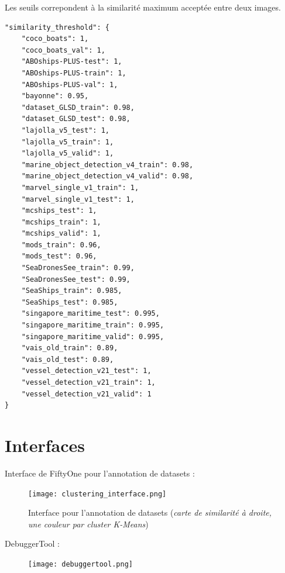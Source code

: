 Les seuils correpondent à la similarité maximum acceptée entre deux images.

\begin{verbatim}
"similarity_threshold": {
    "coco_boats": 1,
    "coco_boats_val": 1,
    "ABOships-PLUS-test": 1,
    "ABOships-PLUS-train": 1,
    "ABOships-PLUS-val": 1,
    "bayonne": 0.95,
    "dataset_GLSD_train": 0.98,
    "dataset_GLSD_test": 0.98,
    "lajolla_v5_test": 1,
    "lajolla_v5_train": 1,
    "lajolla_v5_valid": 1,
    "marine_object_detection_v4_train": 0.98,
    "marine_object_detection_v4_valid": 0.98,
    "marvel_single_v1_train": 1,
    "marvel_single_v1_test": 1,
    "mcships_test": 1,
    "mcships_train": 1,
    "mcships_valid": 1,
    "mods_train": 0.96,
    "mods_test": 0.96,
    "SeaDronesSee_train": 0.99,
    "SeaDronesSee_test": 0.99,
    "SeaShips_train": 0.985,
    "SeaShips_test": 0.985,
    "singapore_maritime_test": 0.995,
    "singapore_maritime_train": 0.995,
    "singapore_maritime_valid": 0.995,
    "vais_old_train": 0.89,
    "vais_old_test": 0.89,
    "vessel_detection_v21_test": 1,
    "vessel_detection_v21_train": 1,
    "vessel_detection_v21_valid": 1
}
\end{verbatim}
\label{seuils_similarite}

\pagebreak

\chapter{Interfaces}

\begin{landscape}
Interface de FiftyOne pour l'annotation de datasets : \\
    \begin{figure}[H]
        \centering
        \texttt{[image: clustering\_interface.png]}
        \caption{Interface pour l'annotation de datasets (\textit{carte de similarité à droite,
        une couleur par cluster K-Means})}
    \end{figure}\label{clustering_interface}
\end{landscape}

\pagebreak

\begin{landscape}
    DebuggerTool : \\
        \begin{figure}[H]
            \centering
            \texttt{[image: debuggertool.png]}
        \end{figure}\label{debuggertool}
    \end{landscape}
